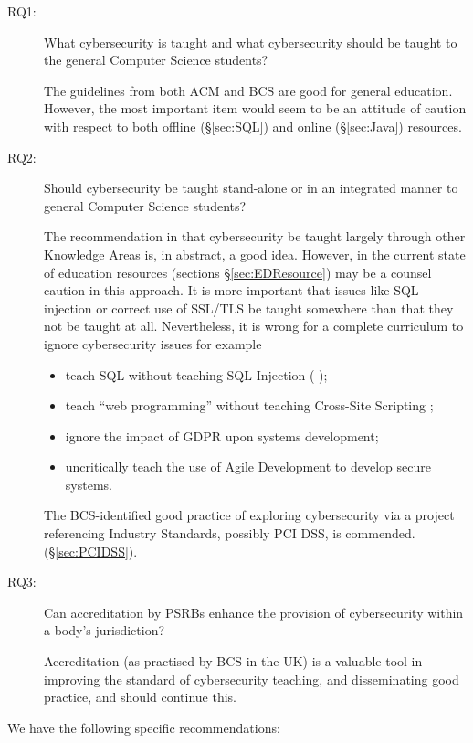\documentclass[conference]{IEEEtran}
\begin{document}
\begin{description}
\item[RQ1:] What cybersecurity is taught and what cybersecurity should be taught to the general Computer Science students?

The guidelines from both ACM and BCS are good for general education. However, the most important item would seem to be an attitude of caution with respect to both offline (\S\ref{sec:SQL}) and online (\S\ref{sec:Java}) resources. 
\item[RQ2:] Should cybersecurity be taught stand-alone or in an integrated manner to general Computer Science students?

The recommendation in \cite[p. 98]{ACM2013a} that cybersecurity be taught largely through other Knowledge Areas is, in abstract, a good idea.  However, in the current state of education resources (sections \S\ref{sec:EDResource})  may be a counsel caution in this approach.  It is more important that issues like SQL injection \cite{Drop2019} or correct use of SSL/TLS \cite{Chenetal2019a} be taught somewhere than that they not be taught at all.
Nevertheless, it is wrong for a complete curriculum to ignore cybersecurity issues for example
\begin{itemize}
	\item teach SQL without teaching SQL Injection (\cite{Drop2019} );
	\item teach ``web programming'' without teaching Cross-Site Scripting \cite[(XSS)]{OWASP2017a};
	\item ignore the  impact of GDPR upon systems development;
	\item uncritically teach the use of Agile Development to develop secure systems.
\end{itemize}
\par
The BCS-identified good practice of exploring cybersecurity via a project referencing Industry Standards, possibly PCI DSS, is commended.(\S\ref{sec:PCIDSS}).
\item[RQ3:] Can accreditation by PSRBs enhance the provision of cybersecurity within a body's jurisdiction?

Accreditation (as practised by BCS in the UK) is a valuable tool in improving the standard of cybersecurity teaching, and disseminating good practice, and should continue this. 
\end{description}

We have the following specific recommendations:
\end{document}
